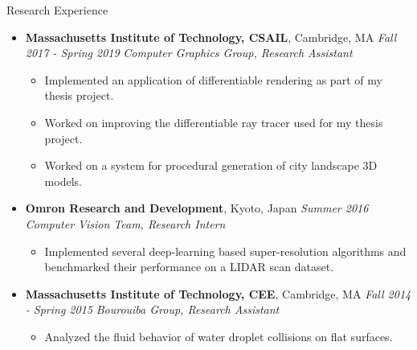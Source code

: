 \documentclass[10pt]{article}
\begin{document}
\begin{area}{Research Experience}
\begin{itemize}
    \item
        \textbf{Massachusetts Institute of Technology, CSAIL}, Cambridge, MA \hfill \emph{Fall 2017 - Spring 2019} \linebreak
        \emph{Computer Graphics Group, Research Assistant}
        \begin{itemize}
            \item Implemented an application of differentiable rendering as part of my thesis project.
            \item Worked on improving the differentiable ray tracer used for my thesis project.
            \item Worked on a system for procedural generation of city landscape 3D models.
        \end{itemize}
    \item
        \textbf{Omron Research and Development}, Kyoto, Japan \hfill \emph{Summer 2016} \linebreak
        \emph{Computer Vision Team, Research Intern}
        \begin{itemize}
            \item Implemented several deep-learning based super-resolution algorithms and benchmarked their performance on a LIDAR scan dataset.
        \end{itemize}
    \item
        \textbf{Massachusetts Institute of Technology, CEE}, Cambridge, MA \hfill \emph{Fall 2014 - Spring 2015} \linebreak
        \emph{Bourouiba Group, Research Assistant}
        \begin{itemize}
            \item Analyzed the fluid behavior of water droplet collisions on flat surfaces.
        \end{itemize}
\end{itemize}
\end{area}
\end{document}
